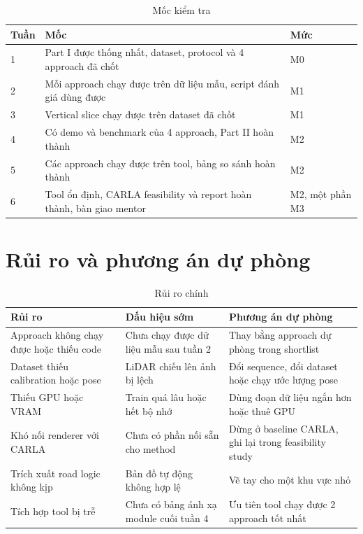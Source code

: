 \begin{table}[H]
  \centering
  \caption{Mốc kiểm tra}
  \begin{tabularx}{\linewidth}{l X l}
    \toprule
    \textbf{Tuần} & \textbf{Mốc} & \textbf{Mức} \\
    \midrule
    1 & Part I được thống nhất, dataset, protocol và 4 approach đã chốt & M0 \\
    2 & Mỗi approach chạy được trên dữ liệu mẫu, script đánh giá dùng được & M1 \\
    3 & Vertical slice chạy được trên dataset đã chốt & M1 \\
    4 & Có demo và benchmark của 4 approach, Part II hoàn thành & M2 \\
    5 & Các approach chạy được trên tool, bảng so sánh hoàn thành & M2 \\
    6 & Tool ổn định, CARLA feasibility và report hoàn thành, bàn giao mentor & M2, một phần M3 \\
    \bottomrule
  \end{tabularx}
\end{table}

\section{Rủi ro và phương án dự phòng}

\begin{table}[H]
  \centering
  \small
  \caption{Rủi ro chính}
  \begin{tabularx}{\linewidth}{>{\raggedright\arraybackslash}X >{\raggedright\arraybackslash}X >{\raggedright\arraybackslash}X}
    \toprule
    \textbf{Rủi ro} & \textbf{Dấu hiệu sớm} & \textbf{Phương án dự phòng} \\
    \midrule
    Approach không chạy được hoặc thiếu code & Chưa chạy được dữ liệu mẫu sau tuần 2 & Thay bằng approach dự phòng trong shortlist \\
    \addlinespace
    Dataset thiếu calibration hoặc pose & LiDAR chiếu lên ảnh bị lệch & Đổi sequence, đổi dataset hoặc chạy ước lượng pose \\
    \addlinespace
    Thiếu GPU hoặc VRAM & Train quá lâu hoặc hết bộ nhớ & Dùng đoạn dữ liệu ngắn hơn hoặc thuê GPU \\
    \addlinespace
    Khó nối renderer với CARLA & Chưa có phần nối sẵn cho method & Dừng ở baseline CARLA, ghi lại trong feasibility study \\
    \addlinespace
    Trích xuất road logic không kịp & Bản đồ tự động không hợp lệ & Vẽ tay cho một khu vực nhỏ \\
    \addlinespace
    Tích hợp tool bị trễ & Chưa có bảng ánh xạ module cuối tuần 4 & Ưu tiên tool chạy được 2 approach tốt nhất \\
    \bottomrule
  \end{tabularx}
\end{table}

